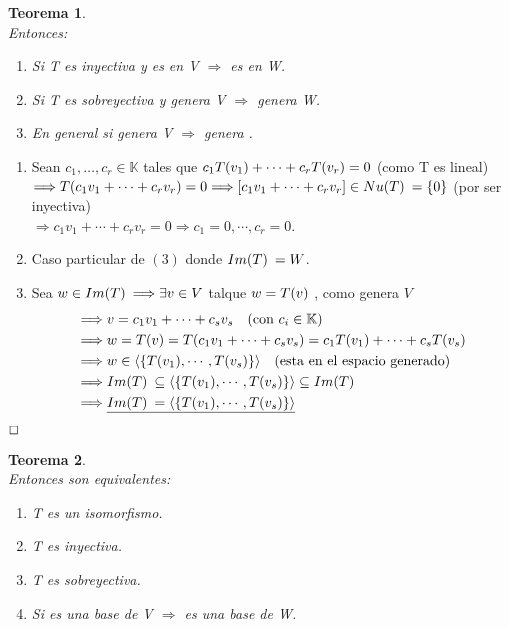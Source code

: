 \documentclass[]{article}
\newtheorem{theorem}{Teorema}
\newenvironment{proof}{\noindent{\bf Prueba:}}{$\hfill \Box$ \vspace{10pt}}
\newcommand{\K}{
    \mathbb{K}
}
\newcommand{\ida}{\Longrightarrow}
\begin{document}
\begin{theorem}
    \\
    Entonces:
    \begin{enumerate}
        \item Si T es inyectiva y  es \li en V
        $\ida$  es \li en W.
        \item Si T es sobreyectiva y  genera V $\ida$
         genera W.
        \item En general si  genera V $\ida$
         genera \I.
    \end{enumerate}
\end{theorem}
\begin{proof}
    \begin{enumerate}
        \item Sean $c_1,\dots,c_r \in \K$ tales que $c_1\text{$T({v_1})$}+\cdots+c_r\text{$T({v_r})$}=0$ (como T es lineal)\\
        $\ida \T{c_1v_1+\cdots+c_rv_r}=0 \ida [c_1v_1+\cdots+c_rv_r] \in \N=\conjunto{0}$ (por ser inyectiva)\\
        $\ida c_1v_1+\cdots+c_rv_r=0 \ida c_1=0,\cdots,c_r=0$.
        \item Caso particular de $(3)$ donde $\text{$Im(T)$}\:=W$.
        \item Sea $w \in \I \ida \exists v \in V$ talque $w=\text{$T({v})$}$ , como  genera $V$
        \begin{align*}
            &\ida v= c_1v_1+\cdots+c_sv_s \quad \text{(con $c_i \in \K$)}\\
            &\ida w=\T{v}=\T{c_1v_1+\cdots+c_sv_s}=c_1\T{v_1}+\cdots+c_s\T{v_s}\\
            &\ida w \in \espgen{\conjunto{\T{v_1},\cdots,\T{v_s}}} \quad \text{(esta en el espacio generado)}\\
            &\ida \I \subseteq \espgen{\conjunto{\T{v_1},\cdots,\T{v_s}}} \subseteq \I\\
            &\ida \underline{\I=\espgen{\conjunto{\T{v_1},\cdots,\T{v_s}}}}  
        \end{align*}
    \end{enumerate}
\end{proof}

\begin{theorem}
    \\
    Entonces son equivalentes:
    \begin{enumerate}
        \item T es un isomorfismo.
        \item T es inyectiva.
        \item T es sobreyectiva.
        \item Si  es una base de V $\ida$  es una base de W.
    \end{enumerate}
\end{theorem}
\end{document}
